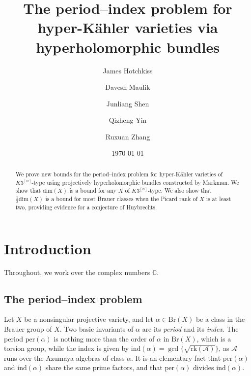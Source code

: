 \documentclass[11pt]{amsart}
\theoremstyle{plain}
\theoremstyle{definition}
\theoremstyle{remark}
\newcommand{\BC}{{\mathbb{C}}}
\begin{document}
\title[The period--index problem]{The period--index problem for hyper-K\"ahler varieties via hyperholomorphic bundles}
\date{\today}



\author[J. Hotchkiss]{James Hotchkiss}
\address{Columbia University}

\author[D. Maulik]{Davesh Maulik}
\address{Massachusetts Institute of Technology}

\author[J. Shen]{Junliang Shen}
\address{Yale University}

\author[Q. Yin]{Qizheng Yin}
\address{Peking University}

\author[R. Zhang]{Ruxuan Zhang}
\address{Fudan University}


\begin{abstract}
We prove new bounds for the period--index problem for hyper-K\"ahler varieties of $K3^{[n]}$-type using projectively hyperholomorphic bundles constructed by Markman. We show that $\mathrm{dim}(X)$ is a bound for any $X$ of $K3^{[n]}$-type. We also show that $\frac{1}{2}\mathrm{dim}(X)$ is a bound for most Brauer classes when the Picard rank of $X$ is at least two, providing evidence for a conjecture of Huybrechts.
\end{abstract}

\maketitle

\setcounter{tocdepth}{1} 

\tableofcontents
\setcounter{section}{-1}

\section{Introduction}

Throughout, we work over the complex numbers $\BC$. 


\subsection{The period--index problem}

Let $X$ be a nonsingular projective variety,
and let $\alpha \in \mathrm{Br}(X)$ be a class in the Brauer group of $X$.
Two basic invariants of $\alpha$ are its \emph{period} and its \emph{index}.  
The period $\mathrm{per}(\alpha)$ is nothing more than the order of $\alpha$ in $\mathrm{Br}(X)$, which is a torsion group, 
while the index is given by $\mathrm{ind}(\alpha) = \gcd\{\sqrt{\mathrm{rk}(\mathcal{A})}\}$, as $\mathcal{A}$ runs over the Azumaya algebras of class $\alpha$.
It is an elementary fact that $\mathrm{per}(\alpha)$ and $\mathrm{ind}(\alpha)$ share the same prime factors, and that $\mathrm{per}(\alpha)$ divides $\mathrm{ind}(\alpha)$. 
\end{document}
